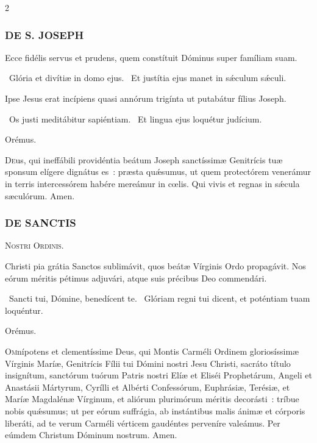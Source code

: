 \documentclass[9pt,twoside]{extarticle}
\begin{document}
\begin{multicols}{2}
{{\subsubsection*{\center \textsc{DE S. JOSEPH}}
\begin{tightlist}{}
\item {}
\item {} Ecce fidélis servus et prudens, quem constítuit Dóminus super famíliam suam.
\item {}~Glória et divítiæ in domo ejus. ~Et justítia ejus manet in sǽculum sǽculi.
\item {} Ipse Jesus erat incípiens quasi annórum trigínta ut putabátur fílius Joseph.
\item {}~Os justi meditábitur sapiéntiam. ~Et lingua ejus loquétur judícium.
\item Orémus. \hfill {}
\end{tightlist}
\lettrine{D}eus, qui ineffábili providéntia beátum Joseph sanctíssimæ Genitrícis tuæ sponsum elígere dignátus es~: præsta quǽsumus, ut quem protectórem venerámur in terris intercessórem habére mereámur in cœlis. Qui vivis et regnas in sǽcula sæculórum. Amen.

\subsubsection*{\center \textsc{DE SANCTIS}}
\begin{center}\textsc{Nostri Ordinis.}\end{center}
\begin{tightlist}{}
\item {} Christi pia grátia Sanctos sublimávit, quos beátæ Vírginis Ordo propagávit. Nos eórum méritis pétimus adjuvári, atque suis précibus Deo commendári.
\item {}~Sancti tui, Dómine, benedícent te. ~Glóriam regni tui dicent, et poténtiam tuam loquéntur.
\item Orémus. \hfill {}
\end{tightlist}
\lettrine{O}mnípotens et clementíssime Deus, qui Montis Carméli Ordinem gloriosíssimæ Vírginis Maríæ, Genitrícis Fílii tui Dómini nostri Jesu Christi, sacráto título insignítum, sanctórum tuórum Patris nostri Elíæ et Eliséi Prophetárum, Angeli et Anastásii Mártyrum, Cyrílli et Albérti Confessórum, Euphrásiæ, Terésiæ, et Maríæ Magdalénæ Vírginum, et aliórum plurimórum méritis decorásti~: tríbue nobis quǽsumus; ut per eórum suffrágia, ab instántibus malis ánimæ et córporis liberáti, ad te verum Carméli vérticem gaudéntes perveníre valeámus. Per eúmdem Christum Dóminum nostrum. Amen.

}}
\end{multicols}
\end{document}
